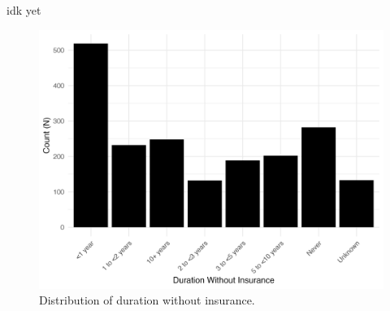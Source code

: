 \documentclass[12pt]{article}
\begin{document}
\newpage
\begin{table}[H]
  \vspace*{0cm}
  \hspace*{-1.75cm} 
  \centering
  \caption{idk yet}
\end{table}

\begin{figure}[H]
  \centering
  \includegraphics[width=15cm]{figures/duration_no_insurance.png}
  \caption{Distribution of duration without insurance.}
\end{figure}
\end{document}
